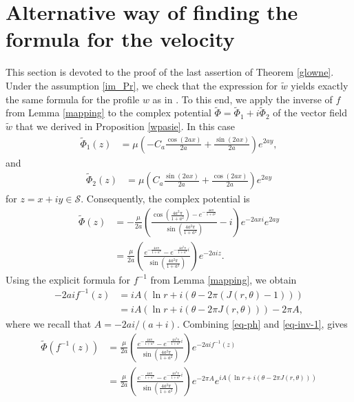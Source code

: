 \documentclass[11pt, letterpaper, reqno]{amsart}
\numberwithin{equation}{section}
\theoremstyle{definition}
\theoremstyle{plain}
\numberwithin{equation}{section}
\def\SS{\mathcal{S}}
\begin{document}
\section{Alternative way of finding the formula for the velocity}\label{sec-velocity}
This section is devoted to the proof of the last assertion of Theorem \ref{glowne}. Under the assumption \eqref{im_Pr}, we check that the expression for $\tilde{w}$ yields exactly the same formula for the profile $w$ as in \cite{CKO}. To this end, we apply the inverse of $f$ from Lemma \ref{mapping} to the complex potential $\tilde\Phi=\tilde\Phi_{1} + i\tilde\Phi_{2}$ of the vector field $\tilde{w}$ that we derived in Proposition \ref{wpasie}. In this case
\begin{align*}
\tilde\Phi_{1}(z) & = \mu\left(-C_{a}\frac{\cos(2ax)}{2a} + \frac{\sin(2ax)}{2a}\right)e^{2ay},
\end{align*}
and
\begin{align*}
\tilde\Phi_{2}(z) & = \mu\left(C_{a}\frac{\sin(2ax)}{2a} + \frac{\cos(2ax)}{2a}\right)e^{2ay}
\end{align*}
for $z=x+iy\in\SS$. Consequently, the complex potential is
\begin{equation}\label{eq-ph}
\begin{aligned}
\tilde \Phi(z) & = -\frac{\mu}{2a}\left(\frac{\cos\left(\frac{4a^{2}\pi}{1+a^{2}}\right) - e^{-\frac{4a\pi}{1+a^{2}}}}{\sin\left(\frac{4a^{2}\pi}{1+a^{2}}\right)} -
i\right)e^{-2axi}e^{2ay} \\
& = \frac{\mu}{2a}\left(\frac{e^{-\frac{4a\pi}{1+a^{2}}} - e^{-\frac{4a^{2}\pi}{1+a^{2}} i}}{\sin\left(\frac{4a^{2}\pi}{1+a^{2}}\right)}\right)e^{-2aiz}.
\end{aligned}
\end{equation}
Using the explicit formula for $f^{-1}$ from Lemma \ref{mapping}, we obtain
\begin{equation}\label{eq-inv-1}
\begin{aligned}
-2aif^{-1}(z) & = iA(\ln r + i(\theta - 2\pi(J(r,\theta) - 1))) \\
& = iA(\ln r + i(\theta - 2\pi J(r,\theta))) - 2\pi A,
\end{aligned}
\end{equation}
where we recall that $A = -2ai/(a+i)$. Combining \eqref{eq-ph} and \eqref{eq-inv-1}, gives
\begin{equation}\label{eq-ph-inv}
\begin{aligned}
\tilde\Phi(f^{-1}(z)) & = \frac{\mu}{2a}\left(\frac{e^{-\frac{4a\pi}{1+a^{2}}} - e^{-\frac{4a^{2}\pi}{1+a^{2}} i}}{\sin\left(\frac{4a^{2}\pi}{1+a^{2}}\right)}\right)e^{-2ai f^{-1}(z)} \\
& = \frac{\mu}{2a}\left(\frac{e^{-\frac{4a\pi}{1+a^{2}}} - e^{-\frac{4a^{2}\pi}{1+a^{2}} i}}{\sin\left(\frac{4a^{2}\pi}{1+a^{2}}\right)}\right) e^{-2\pi A}
e^{iA(\ln r + i(\theta - 2\pi J(r,\theta)))}
\end{aligned}
\end{equation}
\end{document}
